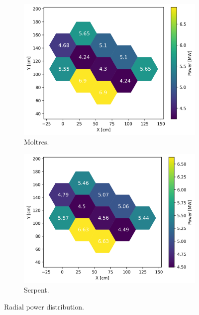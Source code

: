 \documentclass[11pt,letterpaper]{article}
\begin{document}
\begin{figure}[htbp!]
	\centering
	\begin{subfigure}[t]{0.4\textwidth}
		\centering
		\includegraphics[width=\linewidth]{figures-fullcore/3D-fullcore-1200-15Gc-power}
		\caption{Moltres.}
	\end{subfigure}
	\begin{subfigure}[t]{0.4\textwidth}
		\centering
		\includegraphics[width=\linewidth]{figures-fullcore/serpent26G-1200-power}
		\caption{Serpent.}
	\end{subfigure}
	\hfill
	\caption{Radial power distribution.}
	\label{fig:fullcore-1200-power}
\end{figure}
\end{document}
